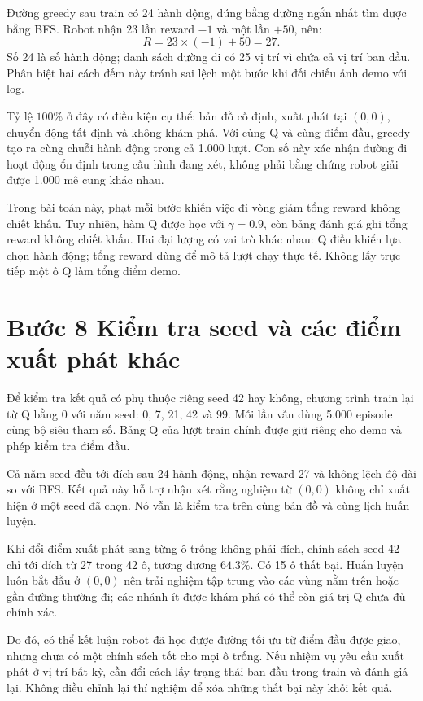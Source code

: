 Đường greedy sau train có 24 hành động, đúng bằng đường ngắn nhất tìm được bằng BFS. Robot nhận 23 lần reward $-1$ và một lần $+50$, nên:
\[
R=23\times(-1)+50=27.
\]
Số 24 là số hành động; danh sách đường đi có 25 vị trí vì chứa cả vị trí ban đầu. Phân biệt hai cách đếm này tránh sai lệch một bước khi đối chiếu ảnh demo với log.

Tỷ lệ $100\%$ ở đây có điều kiện cụ thể: bản đồ cố định, xuất phát tại $(0,0)$, chuyển động tất định và không khám phá. Với cùng Q và cùng điểm đầu, greedy tạo ra cùng chuỗi hành động trong cả 1.000 lượt. Con số này xác nhận đường đi hoạt động ổn định trong cấu hình đang xét, không phải bằng chứng robot giải được 1.000 mê cung khác nhau.

Trong bài toán này, phạt mỗi bước khiến việc đi vòng giảm tổng reward không chiết khấu. Tuy nhiên, hàm Q được học với $\gamma=0.9$, còn bảng đánh giá ghi tổng reward không chiết khấu. Hai đại lượng có vai trò khác nhau: Q điều khiển lựa chọn hành động; tổng reward dùng để mô tả lượt chạy thực tế. Không lấy trực tiếp một ô Q làm tổng điểm demo.

\clearpage
\section{Bước 8 Kiểm tra seed và các điểm xuất phát khác}
Để kiểm tra kết quả có phụ thuộc riêng seed 42 hay không, chương trình train lại từ Q bằng 0 với năm seed: 0, 7, 21, 42 và 99. Mỗi lần vẫn dùng 5.000 episode cùng bộ siêu tham số. Bảng Q của lượt train chính được giữ riêng cho demo và phép kiểm tra điểm đầu.


Cả năm seed đều tới đích sau 24 hành động, nhận reward 27 và không lệch độ dài so với BFS. Kết quả này hỗ trợ nhận xét rằng nghiệm từ $(0,0)$ không chỉ xuất hiện ở một seed đã chọn. Nó vẫn là kiểm tra trên cùng bản đồ và cùng lịch huấn luyện.

Khi đổi điểm xuất phát sang từng ô trống không phải đích, chính sách seed 42 chỉ tới đích từ 27 trong 42 ô, tương đương $64.3\%$. Có 15 ô thất bại. Huấn luyện luôn bắt đầu ở $(0,0)$ nên trải nghiệm tập trung vào các vùng nằm trên hoặc gần đường thường đi; các nhánh ít được khám phá có thể còn giá trị Q chưa đủ chính xác.

Do đó, có thể kết luận robot đã học được đường tối ưu từ điểm đầu được giao, nhưng chưa có một chính sách tốt cho mọi ô trống. Nếu nhiệm vụ yêu cầu xuất phát ở vị trí bất kỳ, cần đổi cách lấy trạng thái ban đầu trong train và đánh giá lại. Không điều chỉnh lại thí nghiệm để xóa những thất bại này khỏi kết quả.

